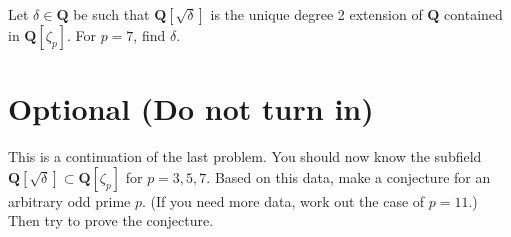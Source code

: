 \documentclass{amsart}
\begin{document}
Let \(\delta \in \mathbf{Q}\) be such that \(\mathbf{Q}[\sqrt \delta]\) is the unique degree 2 extension of \(\mathbf{Q}\) contained in \(\mathbf{Q}[\zeta_{p}]\).
For \(p = 7\), find \(\delta\).
\section{Optional (Do not turn in)}
\label{sec:org2650781}

This is a continuation of the last problem.
You should now know the subfield \(\mathbf{Q}[\sqrt \delta] \subset \mathbf{Q}[\zeta_p]\) for \(p = 3, 5, 7\).
Based on this data, make a conjecture for an arbitrary odd prime \(p\).
(If you need more data, work out the case of \(p = 11\).)
Then try to prove the conjecture.
\end{document}
